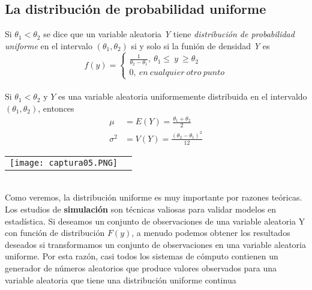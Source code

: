 \documentclass[10pt]{article}\usepackage[]{graphicx}\usepackage[]{color}
\begin{document}
\subsection{La distribución de probabilidad uniforme}
Si $\theta_1 < \theta_2$ se dice que un variable aleatoria \textit{Y} tiene \textit{distribución de probabilidad uniforme} en el intervalo $(\theta_1,\theta_2)$ si y solo si la funión de densidad \textit{Y} es
\begin{equation*}
f(y)=\left\lbrace\begin{array}{c} \frac{1}{\theta_2 - \theta_1},~\theta_1\leq~ y ~\geq \theta_2
\\ 0, ~en~ cualquier~ otro ~punto \end{array}\right.
\end{equation*}\\
Si $\theta_1<\theta_2$ y $Y$ es una variable aleatoria uniformemente distribuida en el intervaldo $(\theta_1,\theta_2)$, entonces
\begin{align*}
\mu&=E(Y)=\frac{\theta_1 +\theta_2}{2}\\
\sigma^2&=V(Y)=\frac{(\theta_2-\theta_1)^2}{12}
\end{align*}
\begin{tabular}{p{} p{} }
\texttt{[image: captura05.PNG]}
\end{tabular}\\
Como veremos, la distribución uniforme es muy importante por razones teóricas. Los estudios de \textbf{simulación} son técnicas valiosas para validar modelos en estadística. Si deseamos 
un conjunto de observaciones de una variable aleatoria Y con función de distribución $F(y)$, a 
menudo podemos obtener los resultados deseados si transformamos un conjunto de observaciones en una variable aleatoria uniforme. Por esta razón, casi todos los sistemas de cómputo 
contienen un generador de números aleatorios que produce valores observados para una variable aleatoria que tiene una distribución uniforme continua
\end{document}
